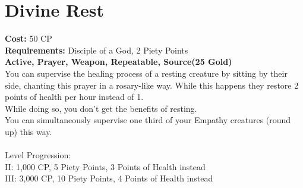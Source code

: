 \section{Divine Rest}\label{prayer:divineRest}
\textbf{Cost:} 50 CP\\
\textbf{Requirements:} Disciple of a God, 2 Piety Points \\
\textbf{Active, Prayer, Weapon, Repeatable, Source(25 Gold)}\\
You can supervise the healing process of a resting creature by sitting by their side, chanting this prayer in a rosary-like way.
While this happens they restore 2 points of health per hour instead of 1.\\
While doing so, you don't get the benefits of resting.\\
You can simultaneously supervise one third of your Empathy creatures (round up) this way.\\
\\
Level Progression:\\
II: 1,000 CP, 5 Piety Points, 3 Points of Health instead\\
III: 3,000 CP, 10 Piety Points, 4 Points of Health instead\\